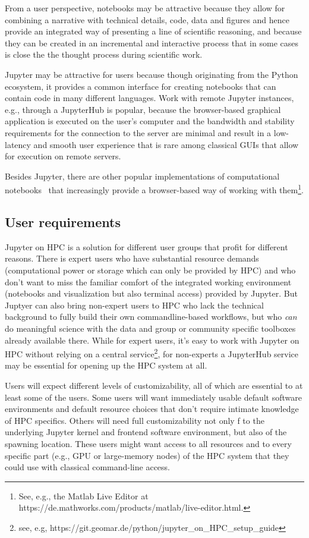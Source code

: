 From a user perspective, notebooks may be attractive because they allow for combining a narrative with technical details, code, data and figures and hence provide an integrated way of presenting a line of scientific reasoning, and because they can be created in an incremental and interactive process that in some cases is close the the thought process during scientific work.

Jupyter may be attractive for users because though originating from the Python ecosystem, it provides a common interface for creating notebooks that can contain code in many different languages.
Work with remote Jupyter instances, e.g., through a JupyterHub is popular, because the browser-based graphical application is executed on the user's computer and the bandwidth and stability requirements for the connection to the server are minimal and result in a low-latency and smooth user experience that is rare among classical GUIs that allow for execution on remote servers.

Besides Jupyter, there are other popular implementations of computational notebooks~\citep{Hinsen2019a} that increasingly provide a browser-based way of working with them\footnote{See, e.g., the Matlab Live Editor at https://de.mathworks.com/products/matlab/live-editor.html.}.


\subsection{User requirements}

Jupyter on HPC is a solution for different user groups that profit for different reasons.
There is expert users who have substantial resource demands (computational power or storage which can only be provided by HPC) and who don't want to miss the familiar comfort of the integrated working environment (notebooks and visualization but also terminal access) provided by Jupyter.
But Juptyer can also bring non-expert users to HPC who lack the technical background to fully build their own commandline-based workflows, but who \emph{can} do meaningful science with the data and group or community specific toolboxes already available there.
While for expert users, it's easy to work with Jupyter on HPC without relying on a central service\footnote{see, e.g, https://git.geomar.de/python/jupyter_on_HPC_setup_guide}, for non-experts a JupyterHub service may be essential for opening up the HPC system at all.

Users will expect different levels of customizability, all of which are essential to at least some of the users.
Some users will want immediately usable default software environments and default resource choices that don't require intimate knowledge of HPC specifics.
Others will need full customizability not only f to the underlying Jupyter kernel and frontend software environment, but also of the spawning location.
These users might want access to all resources and to every specific part (e.g., GPU or large-memory nodes) of the HPC system that they could use with classical command-line access.

